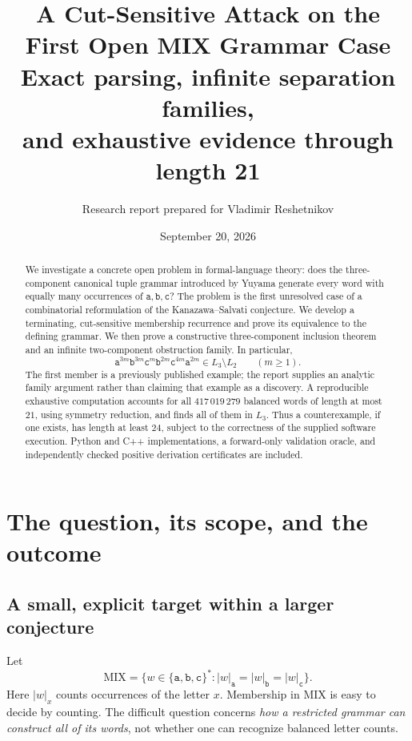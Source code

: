\documentclass[11pt,letterpaper]{article}
\title{\color{inkblue}\bfseries A Cut-Sensitive Attack on the\allowbreak{} First Open MIX Grammar Case\\[5pt]
\large Exact parsing, infinite separation families,\protect\\
 and exhaustive evidence through length 21}
\author{Research report prepared for Vladimir Reshetnikov}
\date{September 20, 2026}
\numberwithin{equation}{section}
\theoremstyle{definition}
\theoremstyle{remark}
\newcommand{\Mix}{\mathrm{MIX}}
\newcommand{\len}[1]{\lvert #1\rvert}
\renewcommand{\aa}{\mathtt a}
\newcommand{\bb}{\mathtt b}
\newcommand{\cc}{\mathtt c}
\begin{document}
\maketitle
\begin{abstract}
We investigate a concrete open problem in formal-language theory: does the
three-component canonical tuple grammar introduced by Yuyama generate every word
with equally many occurrences of \(\aa,\bb,\cc\)?  The problem is the first
unresolved case of a combinatorial reformulation of the Kanazawa--Salvati
conjecture.  We develop a terminating, cut-sensitive membership recurrence and
prove its equivalence to the defining grammar.  We then prove a constructive
three-component inclusion theorem and an infinite two-component obstruction
family.  In particular,
\[
 \aa^{3m}\bb^{3m}\cc^m\bb^{2m}\cc^{4m}\aa^{2m}
 \in L_3\setminus L_2\qquad(m\geq1).
\]
The first member is a previously published example; the report supplies an
analytic family argument rather than claiming that example as a discovery.
A reproducible exhaustive computation accounts for all \(417\,019\,279\)
balanced words of length at most \(21\), using symmetry reduction, and finds
all of them in \(L_3\).  Thus a counterexample, if one exists, has length at
least \(24\), subject to the correctness of the supplied software execution.
Python and C++ implementations, a forward-only validation oracle, and
independently checked positive derivation certificates are included.
\end{abstract}
\begin{center}
\end{center}
\clearpage
\begingroup
\small
\setlength{\parskip}{0pt}
\tableofcontents
\endgroup
\newpage

\section{The question, its scope, and the outcome}
\label{sec:question}

\subsection{A small, explicit target within a larger conjecture}
Let
\[
 \Mix=\{w\in\{\aa,\bb,\cc\}^{*}:
       \len{w}_{\aa}=\len{w}_{\bb}=\len{w}_{\cc}\}.
\]
Here \(\len{w}_x\) counts occurrences of the letter \(x\).  Membership in
\(\Mix\) is easy to decide by counting.  The difficult question concerns
\emph{how a restricted grammar can construct all of its words}, not whether
one can recognize balanced letter counts.
\end{document}
